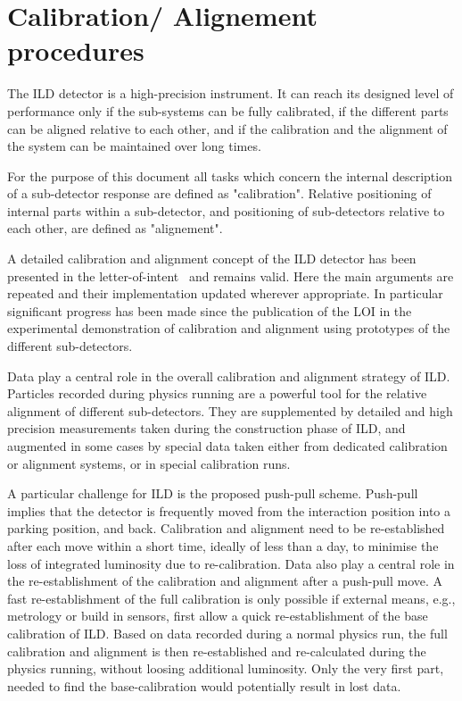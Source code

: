 \section{Calibration/ Alignement procedures}

The ILD detector is a high-precision instrument. It can reach its designed level of performance only if the sub-systems can be fully calibrated, if the different parts can be aligned relative to each other, and if the calibration and the alignment of the system can be maintained over long times. 

For the purpose of this document all tasks which concern the internal description of a sub-detector response are defined as "calibration". Relative positioning of internal parts within a sub-detector, and positioning of sub-detectors relative to each other, are defined as "alignement". 

A detailed calibration and alignment concept of the ILD detector has been presented in the letter-of-intent~\cite{ild:bib:ILDloi} and remains valid. Here the main arguments are repeated and their implementation updated wherever appropriate. In particular significant progress has been made since the publication of the LOI in the experimental demonstration of calibration and alignment using prototypes of the different sub-detectors. 

Data play a central role in the overall calibration and alignment strategy of ILD. Particles recorded during physics running are a powerful tool for the relative alignment of different sub-detectors. They are supplemented by detailed and high precision measurements taken during the construction phase of ILD, and  augmented in some cases by special data taken either from dedicated calibration or alignment systems, or in special calibration runs. 

A particular challenge for ILD is the proposed push-pull scheme. Push-pull implies that the detector is frequently moved from the interaction position into a parking position, and back. Calibration and alignment need to be re-established after each move within a short time, ideally of less than a day, to minimise the loss of integrated luminosity due to re-calibration. 
Data also play a central role in the re-establishment of the calibration and alignment after a push-pull move. A fast re-establishment of the full calibration is only possible if external means, e.g., metrology or build in sensors, first allow a quick re-establishment of the base calibration of ILD. Based on data recorded during a normal physics run, the full calibration and alignment is then re-established and re-calculated during the physics running, without loosing additional luminosity. Only the very first part, needed to find the base-calibration would potentially result in lost data. 

